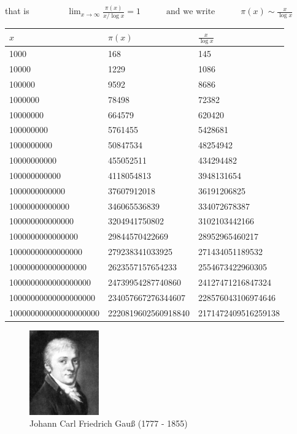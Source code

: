 \documentclass[landscape,display]{powersem} %
\newcommand{\heading}[1]{%
 \begin{center}
  \large\bf
  \shadowbox{{\textcolor{conceptcolor}{#1}}}%
 \end{center}
 \vspace{1ex minus 1ex}}
\begin{document}
\begin{slide}
\heading{$\pi(x)$ is about $\frac x{\log x}$ }\pause
that is
$\qquad\qquad\displaystyle{
\lim_{x\rightarrow\infty}\frac{\pi(x)}{x/\log x}=1\quad\qquad\text{and we write}\qquad\quad\pi(x)\sim \frac x{\log x}}$\pause
\begin{center}\begin{tiny}
\begin{tabular}{|l|l|l|}
  \hline
     $x$ & $\pi(x)$ & $\frac x{\log x}$\\
\hline
1000   & 168  &   145\\
10000& 1229&  1086   \\
100000&9592&  8686     \\
1000000&   78498& 72382  \\
10000000&  664579& 620420   \\
100000000& 5761455&   5428681\\
1000000000&50847534  & 48254942\\
10000000000&  455052511& 434294482\\
100000000000&     4118054813&3948131654\\
1000000000000&   37607912018&36191206825    \\
10000000000000&  346065536839&334072678387    \\
100000000000000 & 3204941750802&3102103442166   \\
1000000000000000 &29844570422669&28952965460217   \\
10000000000000000 &279238341033925&271434051189532  \\
100000000000000000 &2623557157654233&2554673422960305 \\
1000000000000000000 &24739954287740860&24127471216847324\\
10000000000000000000 &234057667276344607&228576043106974646 \\
100000000000000000000 & 2220819602560918840&2171472409516259138 \\
\hline
\end{tabular}
\end{tiny}\end{center}
\end{slide}

\begin{slide}
\heading{The Gau\ss\ Conjecture}
\begin{figure}
  \centering \includegraphics[width=3cm]{images/Gauss_1803.jpeg}\\
Johann Carl Friedrich Gau\ss
(1777 - 1855)
 \end{figure}\pause

\heading{$\pi(x)\sim \displaystyle{\int_{0}^x\frac{du}{\log u}}$}
\end{slide}
\end{document}
